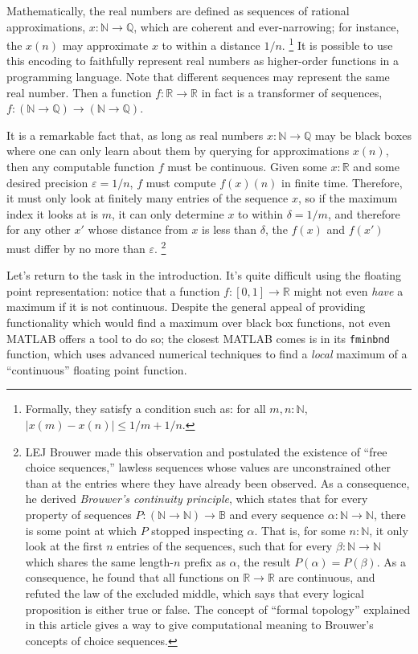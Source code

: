 \documentclass{article}
\newcommand{\nat}{\mathbb{N}}
\newcommand{\rat}{\mathbb{Q}}
\newcommand{\R}{\mathbb{R}}
\newcommand{\bool}{\mathbb{B}}
\begin{document}
Mathematically, the real numbers are defined as sequences of rational approximations, $x : \nat \to \rat$, which are coherent and ever-narrowing; for instance, the $x(n)$ may approximate $x$ to within a distance $1/n$. \footnote{Formally, they satisfy a condition such as: for all $m, n : \nat$, $|x(m) - x(n)| \le 1/m + 1/n$.} It is possible to use this encoding to faithfully represent real numbers as higher-order functions in a programming language. Note that different sequences may represent the same real number. Then a function $f : \R \to \R$ in fact is a transformer of sequences, $f : (\nat \to \rat) \to (\nat \to \rat)$.

It is a remarkable fact that, as long as real numbers $x : \nat \to \rat$ may be black boxes where one can only learn about them by querying for approximations $x(n)$, then any computable function $f$ must be continuous. Given some $x : \R$ and some desired precision $\varepsilon = 1 / n$, $f$ must compute $f(x)(n)$ in finite time. Therefore, it must only look at finitely many entries of the sequence $x$, so if the maximum index it looks at is $m$, it can only determine $x$ to within $\delta = 1 / m$, and therefore for any other $x'$ whose distance from $x$ is less than $\delta$, the $f(x)$ and $f(x')$ must differ by no more than $\varepsilon$.
\footnote{LEJ Brouwer made this observation and postulated the existence of ``free choice sequences,'' lawless sequences whose values are unconstrained other than at the entries where they have already been observed. As a consequence, he derived \emph{Brouwer's continuity principle}, which states that for every property of sequences $P : (\nat \to \nat) \to \bool$ and every sequence $\alpha : \nat \to \nat$, there is some point at which $P$ stopped inspecting $\alpha$. That is, for some $n : \nat$, it only look at the first $n$ entries of the sequences, such that for every $\beta : \nat \to \nat$ which shares the same length-$n$ prefix as $\alpha$, the result $P(\alpha) = P(\beta)$. As a consequence, he found that all functions on $\R \to \R$ are continuous, and refuted the law of the excluded middle, which says that every logical proposition is either true or false. The concept of ``formal topology'' explained in this article gives a way to give computational meaning to Brouwer's concepts of choice sequences.}

Let's return to the task in the introduction. It's quite difficult using the floating point representation: notice that a function $f : [0,1] \to \R$ might not even \emph{have} a maximum if it is not continuous. Despite the general appeal of providing functionality which would find a maximum over black box functions, not even MATLAB offers a tool to do so; the closest MATLAB comes is in its \texttt{fminbnd} function, which uses advanced numerical techniques to find a \emph{local} maximum of a ``continuous'' floating point function.
\end{document}
